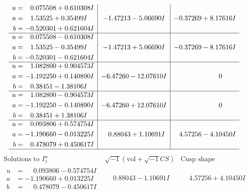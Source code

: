 \documentclass[1p]{elsarticle_modified}
\theoremstyle{definition}
\newcommand{\I}{\sqrt{-1}}
\begin{document}
$$\begin{array}{c|c|c}
\begin{aligned}
u &= \phantom{-}0.075508 + 0.610308 I \\
a &= \phantom{-}1.53525 + 0.35499 I \\
b &= -0.520301 + 0.621604 I\end{aligned}
 & -1.47213 - 5.06690 I & -0.37269 + 8.17616 I \\ \hline\begin{aligned}
u &= \phantom{-}0.075508 - 0.610308 I \\
a &= \phantom{-}1.53525 - 0.35499 I \\
b &= -0.520301 - 0.621604 I\end{aligned}
 & -1.47213 + 5.06690 I & -0.37269 - 8.17616 I \\ \hline\begin{aligned}
u &= \phantom{-}1.082800 + 0.904573 I \\
a &= -1.192250 + 0.140890 I \\
b &= \phantom{-}0.38451 - 1.38106 I\end{aligned}
 & -6.47260 - 12.07610 I & \phantom{-0.000000 } 0 \\ \hline\begin{aligned}
u &= \phantom{-}1.082800 - 0.904573 I \\
a &= -1.192250 - 0.140890 I \\
b &= \phantom{-}0.38451 + 1.38106 I\end{aligned}
 & -6.47260 + 12.07610 I & \phantom{-0.000000 } 0 \\ \hline\begin{aligned}
u &= \phantom{-}0.093806 + 0.574754 I \\
a &= -1.190660 - 0.013225 I \\
b &= \phantom{-}0.478079 + 0.450617 I\end{aligned}
 & \phantom{-}0.88043 + 1.10691 I & \phantom{-}4.57256 - 4.10450 I\\
 \hline 
 \end{array}$$\newpage$$\begin{array}{c|c|c}  
\text{Solutions to }I^u_{1}& \I (\text{vol} + \sqrt{-1}CS) & \text{Cusp shape}\\
 \hline 
\begin{aligned}
u &= \phantom{-}0.093806 - 0.574754 I \\
a &= -1.190660 + 0.013225 I \\
b &= \phantom{-}0.478079 - 0.450617 I\end{aligned}
 & \phantom{-}0.88043 - 1.10691 I & \phantom{-}4.57256 + 4.10450 I \\ \hline\begin{aligned}

\end{aligned}
\end{array}$$
\end{document}

